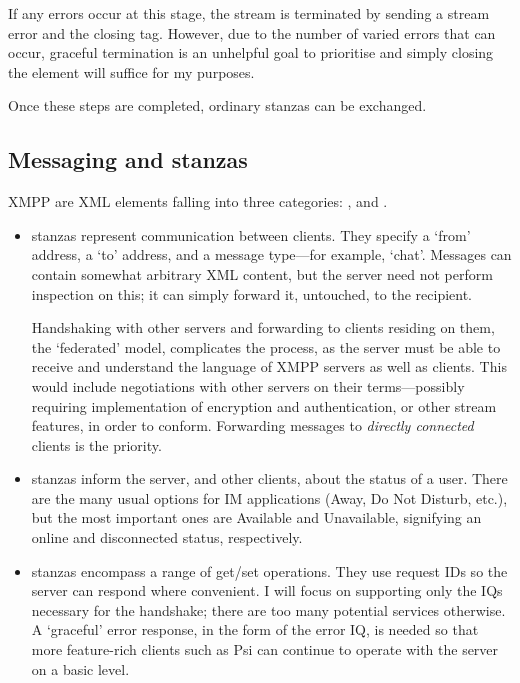 If any errors occur at this stage, the stream is terminated by sending a stream error and the closing  tag. However, due to the number of varied errors that can occur, graceful termination is an unhelpful goal to prioritise and simply closing the  element will suffice for my purposes.

Once these steps are completed, ordinary stanzas can be exchanged.

\subsection{Messaging and stanzas}
XMPP  are XML elements falling into three categories: ,  and .

\begin{itemize}
  \item {} stanzas represent communication between clients. They specify a `from' address, a `to' address, and a message type---for example, `chat'. Messages can contain somewhat arbitrary XML content, but the server need not perform inspection on this; it can simply forward it, untouched, to the recipient.

  Handshaking with other servers and forwarding to clients residing on them, the `federated' model, complicates the process, as the server must be able to receive and understand the language of XMPP servers as well as clients. This would include negotiations with other servers on their terms---possibly requiring implementation of encryption and authentication, or other stream features, in order to conform. Forwarding messages to \emph{directly connected} clients is the priority.

  \item {} stanzas inform the server, and other clients, about the status of a user. There are the many usual options for IM applications (Away, Do Not Disturb, etc.), but the most important ones are Available and Unavailable, signifying an online and disconnected status, respectively.

  \item {} stanzas encompass a range of get/set operations. They use request IDs so the server can respond where convenient. I will focus on supporting only the IQs necessary for the handshake; there are too many potential services otherwise. A `graceful' error response, in the form of the  error IQ, is needed so that more feature-rich clients such as Psi can continue to operate with the server on a basic level.
\end{itemize}

